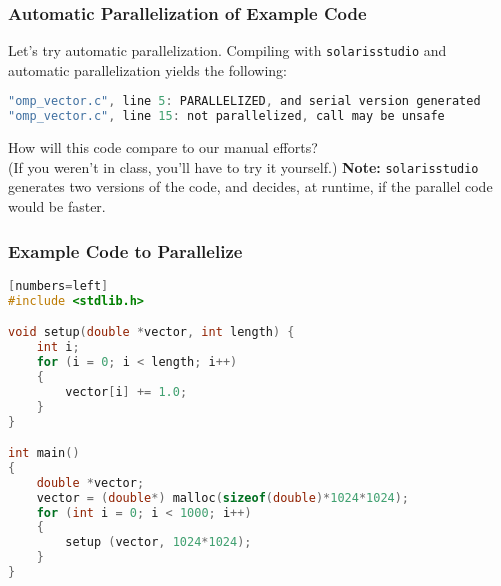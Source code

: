 \begin{frame}[fragile]
  \frametitle{Automatic Parallelization of Example Code}


  Let's try automatic parallelization.
  \vfill
  Compiling with {\tt solarisstudio} and automatic parallelization yields
  the following:


{\scriptsize
  \begin{lstlisting}[language=C]
% solarisstudio-cc -O3 -xautopar -xloopinfo omp_vector.c 
"omp_vector.c", line 5: PARALLELIZED, and serial version generated                 
"omp_vector.c", line 15: not parallelized, call may be unsafe
  \end{lstlisting}
}

  How will this code compare to our manual efforts? \\
  (If you weren't in class, you'll have to try it yourself.)
  \vfill
  {\bf Note:} {\tt solarisstudio} generates two versions of the code, 
  and decides, at runtime, if the parallel code would be faster.


\end{frame}

\begin{frame}[fragile]
  \frametitle{Example Code to Parallelize}


  \begin{lstlisting}[language=C][numbers=left]
#include <stdlib.h>

void setup(double *vector, int length) {
    int i;
    for (i = 0; i < length; i++)
    {
        vector[i] += 1.0;
    }
}

int main()
{
    double *vector;
    vector = (double*) malloc(sizeof(double)*1024*1024);
    for (int i = 0; i < 1000; i++)
    {
        setup (vector, 1024*1024);
    }
}
  \end{lstlisting}

\end{frame}

